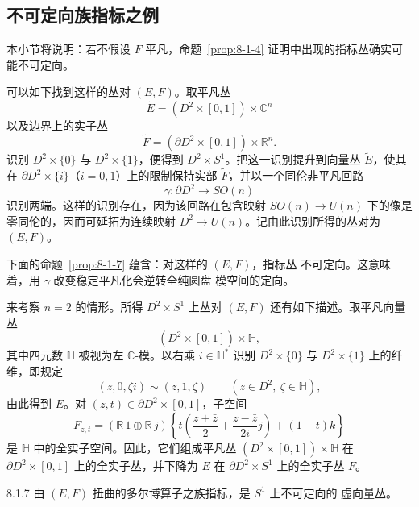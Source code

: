 
\subsection{不可定向族指标之例}
\label{subsec:8-1-2}

本小节将说明：若不假设 $F$ 平凡，命题~\ref{prop:8-1-4}
证明中出现的指标丛确实可能不可定向。

可以如下找到这样的丛对 $(E,F)$。取平凡丛
\[
 \widetilde E=(D^2\times[0,1])\times\mathbb C^n
\]
以及边界上的实子丛%
\[
 \widetilde F=(\partial D^2\times[0,1])\times\mathbb R^n.
\]
识别 $D^2\times\{0\}$ 与 $D^2\times\{1\}$，便得到
$D^2\times S^1$。把这一识别提升到向量丛 $\widetilde E$，使其在
$\partial D^2\times\{i\}$（$i=0,1$）上的限制保持实部
$\widetilde F$，并以一个同伦非平凡回路
\[
 \gamma\colon\partial D^2\longrightarrow SO(n)
\]
识别两端。这样的识别存在，因为该回路在包含映射
$SO(n)\to U(n)$ 下的像是零同伦的，因而可延拓为连续映射
$D^2\to U(n)$。记由此识别所得的丛对为 $(E,F)$。

下面的命题~\ref{prop:8-1-7} 蕴含：对这样的 $(E,F)$，指标丛
不可定向。这意味着，用 $\gamma$ 改变稳定平凡化会逆转全纯圆盘
模空间的定向。

来考察 $n=2$ 的情形。所得 $D^2\times S^1$ 上丛对 $(E,F)$
还有如下描述。取平凡向量丛
\[
 (D^2\times[0,1])\times\mathbb H,
\]
其中四元数 $\mathbb H$ 被视为左 $\mathbb C$-模。以右乘
$i\in\mathbb H^*$ 识别 $D^2\times\{0\}$ 与
$D^2\times\{1\}$ 上的纤维，即规定
\[
 (z,0,\zeta i)\sim(z,1,\zeta)
 \qquad(z\in D^2,\ \zeta\in\mathbb H),
\]
由此得到 $E$。对 $(z,t)\in\partial D^2\times[0,1]$，子空间
\[
 F_{z,t}=(\mathbb R\,1\oplus\mathbb R\,j)
 \left\{
 t\left(\frac{z+\bar z}{2}+\frac{z-\bar z}{2i}j\right)
 +(1-t)k
 \right\}
\]
是 $\mathbb H$ 中的全实子空间。因此，它们组成平凡丛
$(D^2\times[0,1])\times\mathbb H$ 在
$\partial D^2\times[0,1]$ 上的全实子丛，并下降为 $E$ 在
$\partial D^2\times S^1$ 上的全实子丛 $F$。

\begin{proposition}{8.1.7}\label{prop:8-1-7}
由 $(E,F)$ 扭曲的多尔博算子之族指标，是 $S^1$ 上不可定向的
虚向量丛。
\end{proposition}

